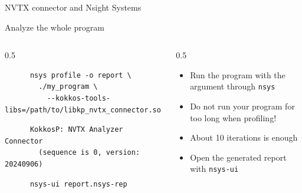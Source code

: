\begin{frame}[fragile]{NVTX connector and Nsight Systems}

  Analyze the whole program
  \vspace{5pt}

  \begin{columns}
    \begin{column}{0.5\linewidth}
      \begin{verbatim}
      nsys profile -o report \
        ./my_program \
          --kokkos-tools-libs=/path/to/libkp_nvtx_connector.so
      \end{verbatim}
      \vspace{5pt}
      \begin{verbatim}
      KokkosP: NVTX Analyzer Connector
        (sequence is 0, version: 20240906)
      \end{verbatim}
      \vspace{5pt}
      \begin{verbatim}
      nsys-ui report.nsys-rep
      \end{verbatim}
    \end{column}
    \begin{column}{0.5\linewidth}
      \begin{itemize}
        \item Run the program with the argument through \texttt{nsys}
        \item Do not run your program for too long when profiling!
        \item About 10 iterations is enough
        \item Open the generated report with \texttt{nsys-ui}
      \end{itemize}
    \end{column}
  \end{columns}

\end{frame}



